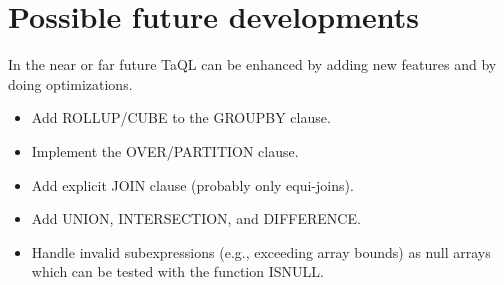 \section{Possible future developments}
In the near or far future TaQL can be enhanced by adding new
features and by doing optimizations.
\begin{itemize}
  \item Add ROLLUP/CUBE to the GROUPBY clause.
  \item Implement the OVER/PARTITION clause.
  \item Add explicit JOIN clause (probably only equi-joins).
  \item Add UNION, INTERSECTION, and DIFFERENCE.
  \item Handle invalid subexpressions (e.g., exceeding array bounds)
    as null arrays which can be tested with the function ISNULL.
\end{itemize}




 





